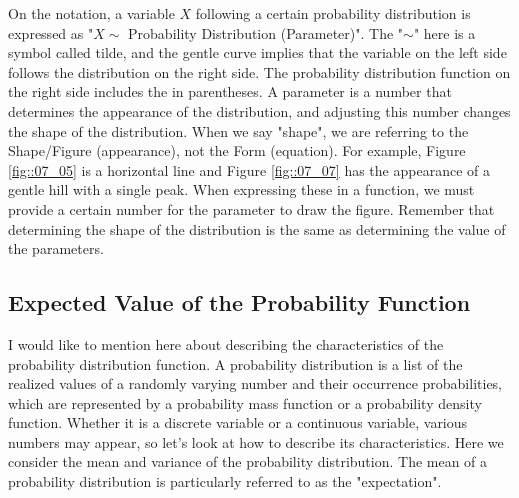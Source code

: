 \documentclass{ltjbook}
\begin{document}
On the notation, a variable $X$ following a certain probability distribution is expressed as "$X\sim$ Probability Distribution (Parameter)". The "$\sim$" here is a symbol called tilde, and the gentle curve implies that the variable on the left side follows the distribution on the right side. The probability distribution function on the right side includes the  in parentheses. A parameter is a number that determines the appearance of the distribution, and adjusting this number changes the shape of the distribution. When we say "shape", we are referring to the Shape/Figure (appearance), not the Form (equation). For example, Figure \ref{fig::07_05} is a horizontal line and Figure \ref{fig::07_07} has the appearance of a gentle hill with a single peak. When expressing these in a function, we must provide a certain number for the parameter to draw the figure. Remember that determining the shape of the distribution is the same as determining the value of the parameters.


\subsection{Expected Value of the Probability Function}
\label{expectation}
I would like to mention here about describing the characteristics of the probability distribution function.
A probability distribution is a list of the realized values of a randomly varying number and their occurrence probabilities, which are represented by a probability mass function or a probability density function.
Whether it is a discrete variable or a continuous variable, various numbers may appear, so let's look at how to describe its characteristics.
Here we consider the mean and variance of the probability distribution. The mean of a probability distribution is particularly referred to as the "expectation".
\end{document}
